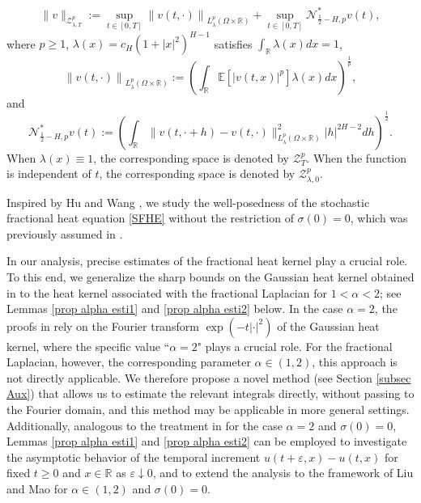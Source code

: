 \documentclass[11pt,reqno]{amsart}
\numberwithin{equation}{section}
\newcommand{\1}{{\bf 1}}
\newcommand{\2}{{\bf 2}}
\begin{document}
     \begin{equation}\label{eq norm Lam}
\|v\|_{\mathcal{Z}_{\lambda,T}^p}:=\sup_{t\in[0,T]}\left\|v(t,\cdot)\right\|_{L_{\lambda}^p(\Omega\times\mathbb{R})}+\sup_{t\in[0,T]}\mathcal{N}_{\frac12-H,p}^*v(t),
\end{equation}
where $p\ge1$,    $\lambda(x)=c_H(1+|x|^2)^{H-1}$ satisfies $\int_{\mathbb{R}}\lambda(x)dx=1$,
\begin{equation}\label{eq norm Lam0}
\left\|v(t,\cdot)\right\|_{L_{\lambda}^p(\Omega\times\mathbb{R})}:=\left(\int_{\mathbb R}\mathbb{E}\left[|v(t,x)|^p\right]\lambda(x)dx\right)^{\frac{1}{p}},
\end{equation}
and
\begin{equation}\label{eq norm Lam*}
\mathcal{N}_{\frac12-H,p}^*v(t):=\left(\int_{\mathbb R}\| v(t,\cdot+h)-v(t,\cdot)\|_{L_{\lambda}^p(\Omega\times\mathbb{R})}^2|h|^{2H-2}dh\right)^{\frac12}.
\end{equation}
    When $\lambda(x)\equiv1$, the corresponding space is denoted by $\mathcal{Z}_{T}^p$.  When the function is independent of $t$, the corresponding space is denoted by $\mathcal{Z}_{\lambda,0}^p$.

 
 Inspired by Hu and Wang  \cite{HW2022}, we study  the well-posedness of the stochastic fractional heat equation \eqref{SFHE} without the  restriction  of $\sigma(0)=0$, which was previously assumed in \cite{LM2022}.
 
  In our analysis,   precise  estimates of the fractional heat kernel  play a crucial role.   To this end, we generalize the sharp bounds on the  Gaussian heat kernel  obtained in \cite[Lemma 2.10 and Lemma 2.11]{HW2022} to the heat kernel  associated with the fractional Laplacian for $1<\alpha<2$; see Lemmas \ref{prop alpha esti1} and  \ref{prop alpha esti2} below.   In the case   $\alpha=2$, the proofs   in \cite{HW2022} rely on the Fourier transform  $\exp(-t|\cdot|^2)$ of the Gaussian heat kernel, where the specific value  ``$\alpha=2$" plays a crucial role. For the fractional Laplacian, however, the corresponding parameter   $\alpha\in (1, 2)$,   this approach is not directly applicable.  We therefore propose a novel method (see Section \ref{subsec Aux})   that allows us to estimate the relevant integrals directly, without passing to the Fourier domain, and this method may be applicable in more general settings.     Additionally, analogous to the treatment in \cite{QWWX2026} for the case $\alpha=2$ and $\sigma(0)=0$, Lemmas \ref{prop alpha esti1} and \ref{prop alpha esti2} can be employed to investigate the asymptotic behavior of the temporal increment $u(t+\varepsilon, x)-u(t, x)$ for fixed $t \ge 0$ and $x \in \mathbb{R}$ as $\varepsilon \downarrow 0$, and to extend the analysis to the framework of Liu and Mao \cite{LM2022} for $\alpha \in (1,2)$ and $\sigma(0)=0$.
\end{document}
